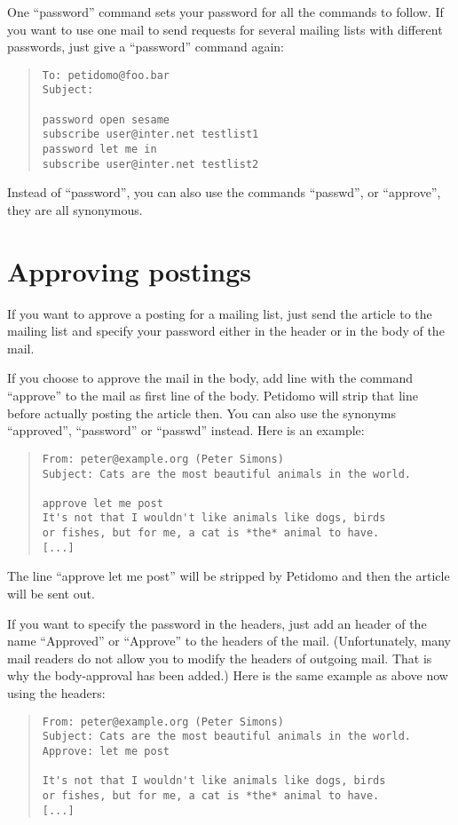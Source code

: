 \documentclass[a4paper,11pt]{scrreprt}
\begin{document}
One ``password'' command sets your password for all the commands to
follow. If you want to use one mail to send requests for several
mailing lists with different passwords, just give a ``password''
command again:
\begin{quote}
\begin{verbatim}
To: petidomo@foo.bar
Subject:

password open sesame
subscribe user@inter.net testlist1
password let me in
subscribe user@inter.net testlist2
\end{verbatim}
\end{quote}

Instead of ``password'', you can also use the commands ``passwd'', or
``approve'', they are all synonymous.

\section{Approving postings}

If you want to approve a posting for a mailing list, just send the
article to the mailing list and specify your password either in the
header or in the body of the mail.

If you choose to approve the mail in the body, add line with the
command ``approve'' to the mail as first line of the body. Petidomo
will strip that line before actually posting the article then. You can
also use the synonyms ``approved'', ``password'' or ``passwd''
instead. Here is an example:
\begin{quote}
\begin{verbatim}
From: peter@example.org (Peter Simons)
Subject: Cats are the most beautiful animals in the world.

approve let me post
It's not that I wouldn't like animals like dogs, birds
or fishes, but for me, a cat is *the* animal to have.
[...]
\end{verbatim}
\end{quote}

The line ``approve let me post'' will be stripped by Petidomo and
then the article will be sent out.

If you want to specify the password in the headers, just add an header
of the name ``Approved'' or ``Approve'' to the headers of the mail.
(Unfortunately, many mail readers do not allow you to modify the
headers of outgoing mail. That is why the body-approval has been
added.) Here is the same example as above now using the headers:
\begin{quote}
\begin{verbatim}
From: peter@example.org (Peter Simons)
Subject: Cats are the most beautiful animals in the world.
Approve: let me post

It's not that I wouldn't like animals like dogs, birds
or fishes, but for me, a cat is *the* animal to have.
[...]
\end{verbatim}
\end{quote}
\end{document}
